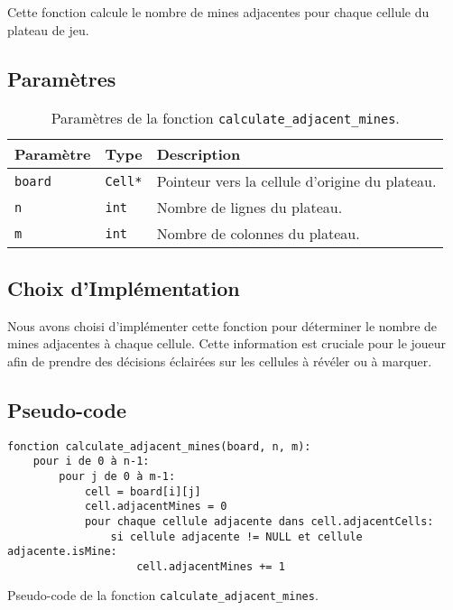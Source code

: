 Cette fonction calcule le nombre de mines adjacentes pour chaque cellule du plateau de jeu.

\subsection{Paramètres}

\begin{table}[!htpb]
    \label{tab:parameters-calculate_adjacent_mines}
    \begin{tabularx}{\textwidth}{lXX}
        \toprule
        \textbf{Paramètre} & \textbf{Type} & \textbf{Description} \\
        \midrule
        \texttt{board} & \texttt{Cell*} & Pointeur vers la cellule d'origine du plateau. \\
        \texttt{n} & \texttt{int} & Nombre de lignes du plateau. \\
        \texttt{m} & \texttt{int} & Nombre de colonnes du plateau. \\
        \bottomrule
    \end{tabularx}
    \caption{Paramètres de la fonction \texttt{calculate\_adjacent\_mines}.}
\end{table}

\subsection{Choix d'Implémentation}
Nous avons choisi d'implémenter cette fonction pour déterminer le nombre de mines adjacentes à chaque cellule. Cette information est cruciale pour le joueur afin de prendre des décisions éclairées sur les cellules à révéler ou à marquer.

\subsection{Pseudo-code}

\begin{longlisting}
    \begin{verbatim}
fonction calculate_adjacent_mines(board, n, m):
    pour i de 0 à n-1:
        pour j de 0 à m-1:
            cell = board[i][j]
            cell.adjacentMines = 0
            pour chaque cellule adjacente dans cell.adjacentCells:
                si cellule adjacente != NULL et cellule adjacente.isMine:
                    cell.adjacentMines += 1
    \end{verbatim}
    \caption{Pseudo-code de la fonction \texttt{calculate\_adjacent\_mines}.}
\end{longlisting}


